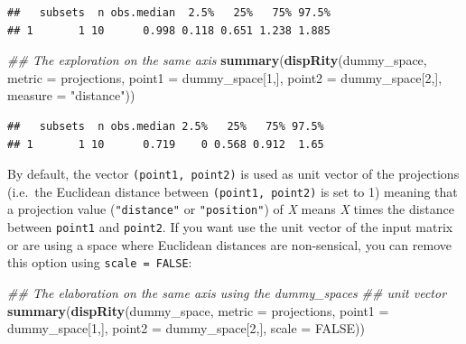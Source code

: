 \documentclass[
]{book}
\newenvironment{Shaded}{\begin{snugshade}}{\end{snugshade}}
\newcommand{\CommentTok}[1]{\textcolor[rgb]{0.56,0.35,0.01}{\textit{#1}}}
\newcommand{\DataTypeTok}[1]{\textcolor[rgb]{0.13,0.29,0.53}{#1}}
\newcommand{\DecValTok}[1]{\textcolor[rgb]{0.00,0.00,0.81}{#1}}
\newcommand{\KeywordTok}[1]{\textcolor[rgb]{0.13,0.29,0.53}{\textbf{#1}}}
\newcommand{\NormalTok}[1]{#1}
\newcommand{\OtherTok}[1]{\textcolor[rgb]{0.56,0.35,0.01}{#1}}
\newcommand{\StringTok}[1]{\textcolor[rgb]{0.31,0.60,0.02}{#1}}
\begin{document}
\begin{verbatim}
##   subsets  n obs.median  2.5%   25%   75% 97.5%
## 1       1 10      0.998 0.118 0.651 1.238 1.885
\end{verbatim}

\begin{Shaded}
\begin{Highlighting}[]
\CommentTok{\#\# The exploration on the same axis}
\KeywordTok{summary}\NormalTok{(}\KeywordTok{dispRity}\NormalTok{(dummy\_space, }\DataTypeTok{metric =}\NormalTok{ projections,}
                              \DataTypeTok{point1 =}\NormalTok{ dummy\_space[}\DecValTok{1}\NormalTok{,],}
                              \DataTypeTok{point2 =}\NormalTok{ dummy\_space[}\DecValTok{2}\NormalTok{,],}
                              \DataTypeTok{measure =} \StringTok{"distance"}\NormalTok{))}
\end{Highlighting}
\end{Shaded}

\begin{verbatim}
##   subsets  n obs.median 2.5%   25%   75% 97.5%
## 1       1 10      0.719    0 0.568 0.912  1.65
\end{verbatim}

By default, the vector \texttt{(point1,\ point2)} is used as unit vector of the projections (i.e.~the Euclidean distance between \texttt{(point1,\ point2)} is set to 1) meaning that a projection value (\texttt{"distance"} or \texttt{"position"}) of \emph{X} means \emph{X} times the distance between \texttt{point1} and \texttt{point2}.
If you want use the unit vector of the input matrix or are using a space where Euclidean distances are non-sensical, you can remove this option using \texttt{scale\ =\ FALSE}:

\begin{Shaded}
\begin{Highlighting}[]
\CommentTok{\#\# The elaboration on the same axis using the dummy\_space\textquotesingle{}s}
\CommentTok{\#\# unit vector}
\KeywordTok{summary}\NormalTok{(}\KeywordTok{dispRity}\NormalTok{(dummy\_space, }\DataTypeTok{metric =}\NormalTok{ projections,}
                              \DataTypeTok{point1 =}\NormalTok{ dummy\_space[}\DecValTok{1}\NormalTok{,],}
                              \DataTypeTok{point2 =}\NormalTok{ dummy\_space[}\DecValTok{2}\NormalTok{,],}
                              \DataTypeTok{scale =} \OtherTok{FALSE}\NormalTok{))}
\end{Highlighting}
\end{Shaded}
\end{document}
